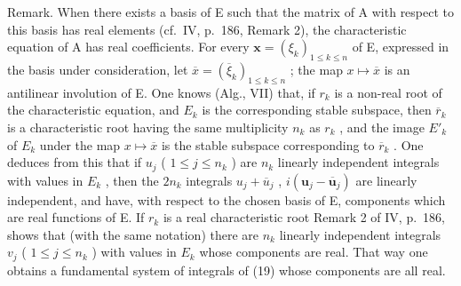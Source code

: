 Remark. When there exists a basis of E such that the matrix of A with respect to this basis has real elements (cf.~IV, p.~186, Remark 2), the characteristic equation of A has real coefficients. For every \(\mathbf{x} = (\xi_k)_{1 \leqslant k \leqslant n}\) of E, expressed in the basis under consideration, let \(\overline{x} = (\overline{\xi}_k)_{1 \leqslant k \leqslant n}\) ; the map \(x \mapsto \overline{x}\) is an antilinear involution of E. One knows (Alg., VII) that, if \(r_k\) is a non-real root of the characteristic equation, and \(E_k\) is the corresponding stable subspace, then \(\overline{r}_k\) is a characteristic root having the same multiplicity \(n_k\) as \(r_k\) , and the image \(E'_k\) of \(E_k\) under the map \(x \mapsto \overline{x}\) is the stable subspace corresponding to \(\overline{r}_k\) . One deduces from this that if \(u_j\) ( \(1 \leqslant j \leqslant n_k\) ) are \(n_k\) linearly independent integrals with values in \(E_k\) , then the \(2n_k\) integrals \(u_j + \overline{u}_j\) , \(i(\mathbf{u}_j - \overline{\mathbf{u}}_j)\) are linearly independent, and have, with respect to the chosen basis of E, components which are real functions of E. If \(r_k\) is a real characteristic root Remark 2 of IV, p.~186, shows that (with the same notation) there are \(n_k\) linearly independent integrals \(v_j\) ( \(1 \leqslant j \leqslant n_k\) ) with values in \(E_k\) whose components are real. That way one obtains a fundamental system of integrals of (19) whose components are all real.

